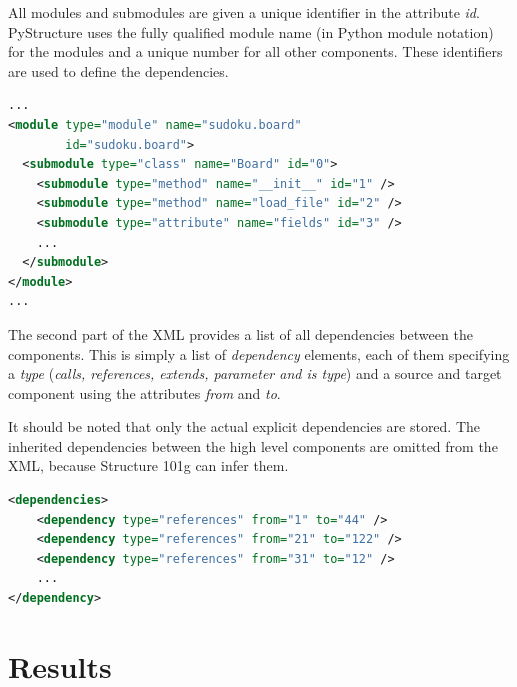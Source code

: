 \documentclass[12pt,halfparskip,DIV11,BCOR10mm]{scrreprt}
\begin{document}
All modules and submodules are given a unique identifier in the attribute \emph{id}. PyStructure uses the fully qualified module name (in Python module notation) for the modules and a unique number for all other components. These identifiers are used to define the dependencies.
\begin{lstlisting}[language=xml]
...
<module type="module" name="sudoku.board" 
        id="sudoku.board">
  <submodule type="class" name="Board" id="0">
    <submodule type="method" name="__init__" id="1" />
    <submodule type="method" name="load_file" id="2" />
    <submodule type="attribute" name="fields" id="3" />
    ...
  </submodule>
</module>
...
\end{lstlisting}

The second part of the XML provides a list of all dependencies between the components. This is simply a list of \emph{dependency} elements, each of them specifying a \emph{type} (\emph{calls, references, extends, parameter and is type}) and a source and target component using the attributes \emph{from} and \emph{to}.

It should be noted that only the actual explicit dependencies are stored. The inherited dependencies between the high level components are omitted from the XML, because Structure 101g can infer them.

\begin{lstlisting}[language=xml]
<dependencies>
    <dependency type="references" from="1" to="44" />
    <dependency type="references" from="21" to="122" />
    <dependency type="references" from="31" to="12" />
    ...
</dependency>
\end{lstlisting}


 
\chapter{Results}
\end{document}

